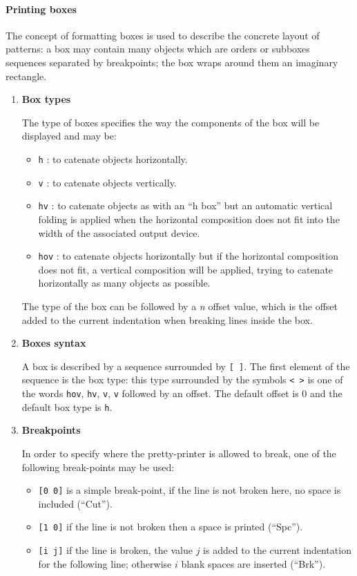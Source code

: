 {\paragraph{Printing boxes}
The concept of formatting boxes is used to describe the concrete
layout of patterns: a box may contain many objects which are orders or
sub\-boxes sequences separated by break\-points; the box wraps around
them an imaginary rectangle.
\begin{enumerate}
\item {\bf Box types}

  The type of boxes specifies the way the components of the box will
  be displayed and may be:
\begin{itemize}
\item \verb+h+ : to catenate objects horizontally.
\item \verb+v+ : to catenate objects vertically.
\item \verb+hv+ : to catenate objects as with an ``h box'' but an
  automatic vertical folding is applied when the horizontal
  composition does not fit into the width of the associated output
  device.

\item \verb+hov+ : to catenate objects horizontally but if the
  horizontal composition does not fit, a vertical composition will be
  applied, trying to catenate horizontally as many objects as possible.
\end{itemize}

The type of the box can be followed by a {\it n} offset value, which
is the offset added to the current indentation when breaking lines
inside the box.


\item {\bf Boxes syntax}

  A box is described by a sequence surrounded by \verb+[ ]+. The first
  element of the sequence is the box type: this type surrounded by the
  symbols \verb+< >+ is one of the words \verb+hov+, \verb+hv+,
  \verb+v+, \verb+v+ followed by an offset. The default offset is 0
  and the default box type is \verb+h+.

\item {\bf Break\-points}

  In order to specify where the pretty-printer is allowed to break,
  one of the following break-points may be used:

\begin{itemize}
\item \verb+[0 0]+ is a simple break-point, if the line is not broken
  here, no space is included (``Cut'').
\item \verb+[1 0]+ if the line is not broken then a space is printed
  (``Spc'').
\item \verb+[i j]+ if the line is broken, the value $j$ is added to the
  current indentation for the following line; otherwise $i$ blank spaces
  are inserted (``Brk'').
\end{itemize}


\end{enumerate}}
